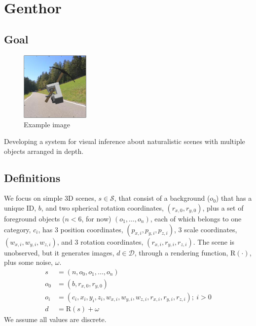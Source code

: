 \documentclass[]{report}
\begin{document}
\section*{Genthor}
\subsection*{Goal}
\setlength{\intextsep}{-40pt}
\begin{figure}
\vspace{-70pt}
\centering
\includegraphics[width=0.3\textwidth]{example.png}
\caption{Example image}
\end{figure}
\setlength{\intextsep}{40pt}

Developing a system for visual inference about naturalistic scenes
with multiple objects arranged in depth.

\subsection*{Definitions}
We focus on simple 3D scenes, $s \in \mathcal{S}$, that consist of a
background ($o_0$) that has a unique ID, $b$, and two spherical
rotation coordinates, $(r_{x,0}, r_{y,0})$, plus a set of foreground
objects ($n < 6$, for now) $(o_1,\dots,o_n)$, each of which belongs to
one category, $c_i$, has 3 position coordinates,
$(p_{x,i},p_{y,i},p_{z,i})$, 3 scale coordinates,
$(w_{x,i},w_{y,i},w_{z,i})$, and 3 rotation coordinates,
$(r_{x,i},r_{y,i},r_{z,i})$.  The scene is unobserved, but it
generates images, $d \in \mathcal{D}$, through a rendering function,
$\mathrm{R}(\cdot)$, plus some noise, $\omega$.
\begin{align*}
  s &= (n,o_0,o_1,\dots,o_n)\\
  o_0 &= (b, r_{x,0}, r_{y,0})\\
  o_i &= (c_i, x_i,y_i,z_i, w_{x,i},w_{y,i},w_{z,i}, r_{x,i},r_{y,i},r_{z,i});\ i > 0\\
  d &= \mathrm{R}(s) + \omega
\end{align*}
We assume all values are discrete.
\end{document}
